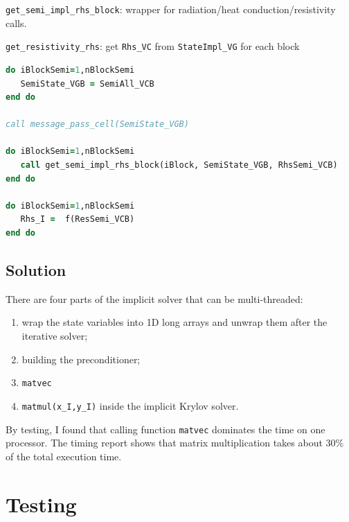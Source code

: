 \documentclass[11pt]{book} %
\begin{document}
\verb|get_semi_impl_rhs_block|: wrapper for radiation/heat conduction/resistivity calls.

\verb|get_resistivity_rhs|: get \verb|Rhs_VC| from \verb|StateImpl_VG| for each block

\begin{lstlisting}[language=Fortran, caption=???]
do iBlockSemi=1,nBlockSemi
   SemiState_VGB = SemiAll_VCB
end do

call message_pass_cell(SemiState_VGB)

do iBlockSemi=1,nBlockSemi
   call get_semi_impl_rhs_block(iBlock, SemiState_VGB, RhsSemi_VCB)
end do

do iBlockSemi=1,nBlockSemi
   Rhs_I =  f(ResSemi_VCB)
end do
\end{lstlisting}



\subsection{Solution}

There are four parts of the implicit solver that can be multi-threaded:
\begin{enumerate}
\item wrap the state variables into 1D long arrays and unwrap them after the iterative solver;
\item building the preconditioner;
\item \verb|matvec|
\item \verb|matmul(x_I,y_I)| inside the implicit Krylov solver.
\end{enumerate}

By testing, I found that calling function \verb|matvec| dominates the time on one processor. The timing report shows that matrix multiplication takes about 30\% of the total execution time.


\section{Testing}
\end{document}
